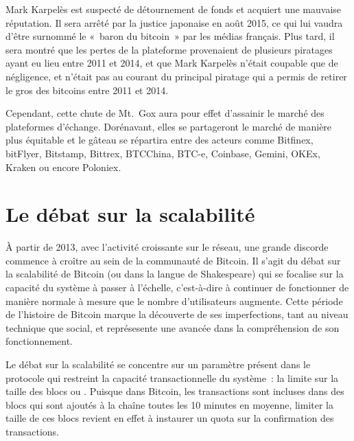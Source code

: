 Mark Karpelès est suspecté de détournement de fonds et acquiert une mauvaise réputation. Il sera arrêté par la justice japonaise en août 2015, ce qui lui vaudra d'être surnommé le «~baron du bitcoin~» par les médias français. Plus tard, il sera montré que les pertes de la plateforme provenaient de plusieurs piratages ayant eu lieu entre 2011 et 2014, et que Mark Karpelès n'était coupable que de négligence, et n'était pas au courant du principal piratage qui a permis de retirer le gros des bitcoins entre 2011 et 2014. %

Cependant, cette chute de Mt.~Gox aura pour effet d'assainir le marché des plateformes d'échange. Dorénavant, elles se partageront le marché de manière plus équitable et le gâteau se répartira entre des acteurs comme Bitfinex, bitFlyer, Bitstamp, Bittrex, BTCChina, BTC-e, Coinbase, Gemini, OKEx, Kraken ou encore Poloniex.

\section*{Le débat sur la scalabilité} %

À partir de 2013, avec l'activité croissante sur le réseau, une grande discorde commence à croître au sein de la communauté de Bitcoin. Il s'agit du débat sur la scalabilité de Bitcoin (ou  dans la langue de Shakespeare) qui se focalise sur la capacité du système à passer à l'échelle, c'est-à-dire à continuer de fonctionner de manière normale à mesure que le nombre d'utilisateurs augmente. Cette période de l'histoire de Bitcoin marque la découverte de ses imperfections, tant au niveau technique que social, et représesente une avancée dans la compréhension de son fonctionnement.

Le débat sur la scalabilité se concentre sur un paramètre présent dans le protocole qui restreint la capacité transactionnelle du système~: la limite sur la taille des blocs ou . Puisque dans Bitcoin, les transactions sont incluses dans des blocs qui sont ajoutés à la chaîne toutes les 10 minutes en moyenne, limiter la taille de ces blocs revient en effet à instaurer un quota sur la confirmation des transactions.

